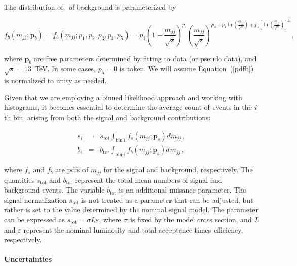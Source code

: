 
The distribution of \mjj~of background is parameterized by

\begin{equation}\label{pdfb}
f_b(m_{jj};\bm{p}_b) = f_b(m_{jj};p_1,p_2,p_3,p_4,p_5) = p_1 \left( 1
- \frac{m_{jj}}{\sqrt{s}} \right)^{p_2} \left( \frac{m_{jj}}{\sqrt{s}}
\right)^{p_3 + p_4\ln\left( \frac{m_{jj}}{\sqrt{s}} \right) +  p_5
  \left[ \ln \left( \frac{m_{jj}}{\sqrt{s}} \right) \right]^2}\, ,  
\end{equation}

\noindent
where $\bm{p}_b$ are free parameters determined by fitting to data (or 
pseudo data), and $\sqrt{s} = 13$~TeV.
In some cases, $p_5 = 0$ is taken. 
We will assume Equation~(\ref{pdfb}) is normalized to unity as needed.

Given that we are employing a binned likelihood approach and working with histograms, it becomes essential to determine the average count of events in the $i$th bin, arising from both the signal and background contributions:

\begin{eqnarray}
s_i & = & s_\mathrm{tot} \int_{\mathrm{bin}\ i} f_s(m_{jj};\bm{p}_s)
dm_{jj}\, ,\\
b_i & = & b_\mathrm{tot} \int_{\mathrm{bin}\ i} f_b(m_{jj};\bm{p}_b) dm_{jj}\, ,
\end{eqnarray}

\noindent
where $f_s$ and $f_b$ are pdfs of $m_{jj}$ for the signal and
background, respectively. 
The quantities $s_\mathrm{tot}$ and $b_\mathrm{tot}$ represent the total mean
numbers of signal and background events.
The variable $b_\mathrm{tot}$ is an additional nuisance parameter.
The signal normalization $s_\mathrm{tot}$ is  not treated as a parameter that can be adjusted, but rather is set to the value determined by the nominal signal model. 
The parameter can be expressed as $s_\mathrm{tot} = \sigma L \varepsilon$,
where $\sigma$ is fixed by the model cross section, and $L$ and
$\varepsilon$ represent the nominal luminosity and total acceptance times
efficiency, respectively.


\paragraph{Uncertainties}\mbox{}\par

